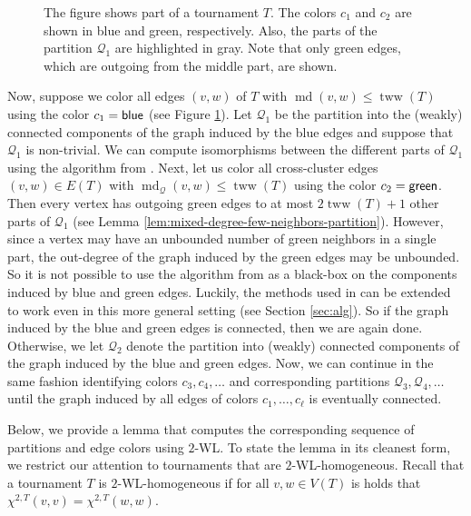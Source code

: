 \documentclass{theoretics}
\newcommand{\CQ}{{\mathcal Q}}
\newcommand{\WL}[2]{\chi^{#1,#2}}
\DeclareMathOperator{\md}{md}
\DeclareMathOperator{\tww}{tww}
\newcommand{\blue}{{\sf blue}}
\newcommand{\green}{{\sf green}}
\begin{document}
\begin{figure}
 \caption{The figure shows part of a tournament $T$. The colors $c_1$ and $c_2$ are shown in blue and green, respectively.
  Also, the parts of the partition $\CQ_1$ are highlighted in gray.
  Note that only green edges, which are outgoing from the middle part, are shown.}
 \label{fig:partition-sequence}
\end{figure}

Now, suppose we color all edges $(v,w)$ of $T$ with $\md(v,w) \leq \tww(T)$ using the color $c_1 = \blue$ (see Figure \ref{fig:partition-sequence}).
Let $\CQ_1$ be the partition into the (weakly) connected components of the graph induced by the blue edges and suppose that $\CQ_1$ is non-trivial.
We can compute isomorphisms between the different parts of $\CQ_1$ using the algorithm from \cite{ArvindPR25}.
Next, let us color all cross-cluster edges $(v,w)\in E(T)$ with $\md_\CQ(v,w) \leq \tww(T)$ using the color $c_2 = \green$.
Then every vertex has outgoing green edges to at most $2\tww(T) + 1$ other parts of $\CQ_1$ (see Lemma \ref{lem:mixed-degree-few-neighbors-partition}).
However, since a vertex may have an unbounded number of green neighbors in a single part, the out-degree of the graph induced by the green edges may be unbounded.
So it is not possible to use the algorithm from \cite{ArvindPR25} as a black-box on the components induced by blue and green edges.
Luckily, the methods used in \cite{ArvindPR25} can be extended to work even in this more general setting (see Section \ref{sec:alg}).
So if the graph induced by the blue and green edges is connected, then we are again done.
Otherwise, we let $\CQ_2$ denote the partition into (weakly) connected components of the graph induced by the blue and green edges.
Now, we can continue in the same fashion identifying colors $c_3,c_4,\dots$ and corresponding partitions $\CQ_3,\CQ_4,\dots$ until the graph induced by all edges of colors $c_1,\dots,c_\ell$ is eventually connected.

Below, we provide a lemma that computes the corresponding sequence of partitions and edge colors using $2$-WL.
To state the lemma in its cleanest form, we restrict our attention to tournaments that are $2$-WL-homogeneous.
Recall that a tournament $T$ is $2$-WL-homogeneous if for all $v,w\in V(T)$ is holds that $\WL{2}{T}(v,v) = \WL{2}{T}(w,w)$.
\end{document}
